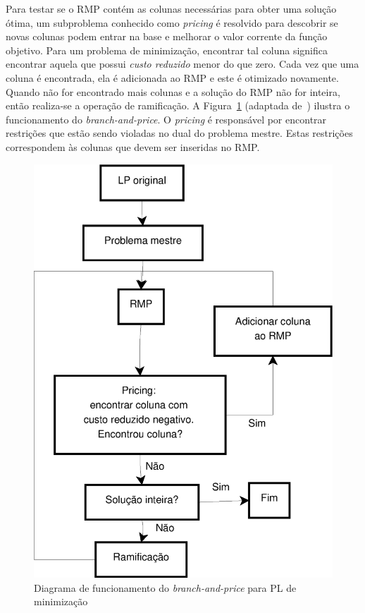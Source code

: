 Para testar se o RMP contém as colunas necessárias para obter uma solução
ótima, um subproblema conhecido como \emph{pricing} é resolvido para
descobrir se novas colunas podem entrar na base e melhorar o valor corrente da
função objetivo. Para um problema de minimização,
encontrar tal coluna significa encontrar aquela que possui
\emph{custo reduzido} menor do que zero. Cada vez que uma coluna é encontrada,
ela é adicionada ao RMP e este é otimizado novamente. Quando não for
encontrado mais colunas e a solução do RMP não for inteira, então realiza-se
a operação de ramificação. A Figura~\ref{fig:branch_and_price} (adaptada de~\cite{Keller2017}) ilustra
o funcionamento do \emph{branch-and-price}. 
O \emph{pricing} é responsável por encontrar restrições que estão sendo
violadas no dual do problema mestre. Estas restrições correspondem às colunas
que devem ser inseridas no RMP. 

\begin{figure}[t]
  \centering
  \includegraphics[scale=0.55]{figuras/branch_and_price} %
  \caption{Diagrama de funcionamento do \emph{branch-and-price} para PL de minimização}
  \label{fig:branch_and_price}
\end{figure}

